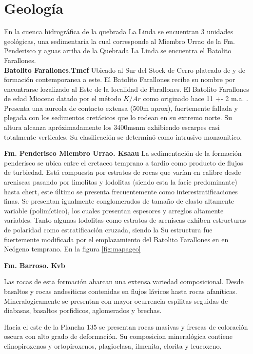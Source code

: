 \section{Geolog\'ia}
En la cuenca hidrogr\'afica de la quebrada La Linda se encuentran 3 unidades geol\'ogicas, una sedimentaria la cual corresponde al Miembro Urrao de la Fm. Penderisco y aguas arriba de la Quebrada La Linda se encuentra el Batolito Farallones.\\

\textbf{Batolito Farallones.Tmcf}
Ubicado al Sur del Stock de Cerro plateado de y de formaci\'on contemporanea a este. El Batolito Farallones recibe su nombre por encontrarse lozalizado al Este de la localidad de Farallones.
El Batolito Farallones de edad Mioceno datado por el m\'etodo $K/Ar$ como originado hace 11 +- 2 m.a. \cite{farallones}. Presenta una aureola de contacto extensa (500m aprox), fuertemente fallada y plegada con los sedimentos cret\'acicos que lo rodean en su extremo norte. Su altura alcanza apr\'oximadamente los 3400msnm exhibiendo escarpes casi totalmente verticales.
Su clasificaci\'on se determin\'o como intrusivo monzonitico.
 

\textbf{Fm. Penderisco Miembro Urrao. Ksaau}
La sedimentaci\'on de la formaci\'on penderisco se ubica entre el cretaceo temprano a tardio como producto de flujos de turbiedad.
Est\'a compuesta por estratos de rocas que var\'ian en calibre desde areniscas pasando por limolitas y lodolitas (siendo esta la facie predominante) hasta chert, este \'ultimo se presenta frecuentemente como interestratificaciones finas. Se presentan igualmente conglomerados de tama\~no de clasto altamente variable (polim\'ictico), los cuales presentan espesores y arreglos altamente variables.
Tanto algunas lodolitas como estratos de areniscas exhiben estructuras de polaridad como estratificaci\'on cruzada, siendo la 
Su estructura fue fuertemente modificada por el emplazamiento del Batolito Farallones en en Ne\'ogeno temprano. \cite{urrao}En la figura \ref{fig:mapageo}

\textbf{Fm. Barroso. Kvb}

Las rocas de esta formaci\'on abarcan una extensa variedad composicional. Desde basaltos y rocas andes\'iticas contenidas en flujos l\'avicos hasta rocas afan\'iticas. Mineralogicamente se presentan con mayor ocurrencia espilitas seguidas de diabasas, basaltos porfidicos, aglomerados y brechas.

Hacia el este de la Plancha 135 se presentan rocas masivas y frescas de coloraci\'on oscura con alto grado de deformaci\'on. Su composicion mineral\'ogica contiene clinopiroxenos y ortopiroxenos, plagioclasa, ilmenita, clorita y leucoxeno.

